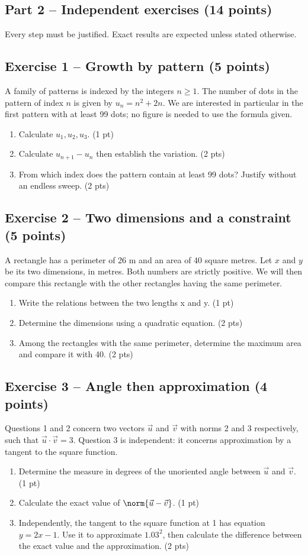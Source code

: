 \mxnewpage\subsection*{Part 2 -- Independent exercises (14 points)}
Every step must be justified. Exact results are expected unless stated otherwise.
\subsection*{Exercise 1 -- Growth by pattern (5 points)}
A family of patterns is indexed by the integers $n\geq1$. The number of dots in the pattern of index $n$ is given by $u_n=n^2+2n$. We are interested in particular in the first pattern with at least 99 dots; no figure is needed to use the formula given.
\begin{enumerate}
\item Calculate $u_1,u_2,u_3$. \hfill(1 pt)
\item Calculate $u_{n+1}-u_n$ then establish the variation. \hfill(2 pts)
\item From which index does the pattern contain at least 99 dots? Justify without an endless sweep. \hfill(2 pts)
\end{enumerate}
\subsection*{Exercise 2 -- Two dimensions and a constraint (5 points)}
A rectangle has a perimeter of 26 m and an area of 40 square metres. Let $x$ and $y$ be its two dimensions, in metres. Both numbers are strictly positive. We will then compare this rectangle with the other rectangles having the same perimeter.
\begin{enumerate}
\item Write the relations between the two lengths x and y. \hfill(1 pt)
\item Determine the dimensions using a quadratic equation. \hfill(2 pts)
\item Among the rectangles with the same perimeter, determine the maximum area and compare it with 40. \hfill(2 pts)
\end{enumerate}
\subsection*{Exercise 3 -- Angle then approximation (4 points)}
Questions 1 and 2 concern two vectors $\vec u$ and $\vec v$ with norms 2 and 3 respectively, such that $\vec u\cdot\vec v=3$. Question 3 is independent: it concerns approximation by a tangent to the square function.
\begin{enumerate}
\item Determine the measure in degrees of the unoriented angle between $\vec u$ and $\vec v$. \hfill(1 pt)
\item Calculate the exact value of $\norm{\vec u-\vec v}$. \hfill(1 pt)
\item Independently, the tangent to the square function at 1 has equation $y=2x-1$. Use it to approximate $1.03^2$, then calculate the difference between the exact value and the approximation. \hfill(2 pts)
\end{enumerate}

